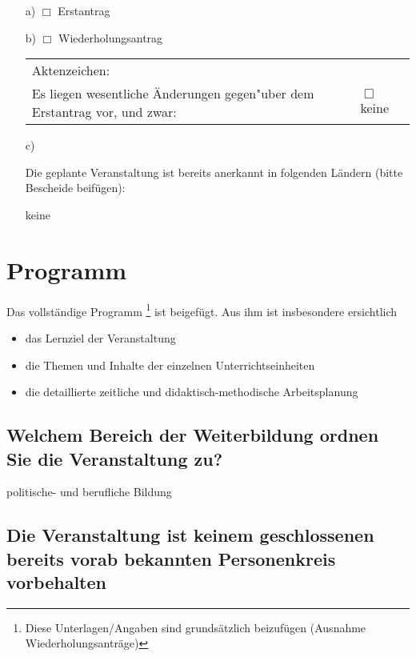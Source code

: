 \documentclass{scrartcl}
\newcommand{\raisedrule}[2][0em]{\leaders\hbox{\rule[#1]{1pt}{#2}}\hfill}
\begin{document}
\begin{enumerate}
\item[a)] $\Box$  Erstantrag

\item[b)] $\Box$  Wiederholungsantrag

          \begin{tabu} to \textwidth {X X}
          Aktenzeichen:      &       \\
          Es liegen wesentliche Änderungen gegen"uber dem Erstantrag vor,
            und zwar:   &   $\Box$ keine \\
            
          \end{tabu}

\item[c)]

    Die geplante Veranstaltung ist bereits anerkannt in folgenden 
    Ländern (bitte Bescheide beifügen):

    keine

\end{enumerate}


\section{Programm}
Das vollständige Programm%
\footnote{Diese Unterlagen/Angaben sind grundsätzlich beizufügen (Ausnahme Wiederholungsanträge)}
ist beigefügt. Aus ihm ist insbesondere ersichtlich
\begin{itemize}
\item das Lernziel der Veranstaltung
\item die Themen und Inhalte der einzelnen Unterrichtseinheiten
\item die detaillierte zeitliche und didaktisch-methodische Arbeitsplanung
\end{itemize}

\subsection{Welchem Bereich der Weiterbildung ordnen Sie die Veranstaltung zu?}

politische- und berufliche Bildung



\subsection{%
Die Veranstaltung ist keinem geschlossenen bereits vorab bekannten 
Personenkreis vorbehalten}
\end{document}
